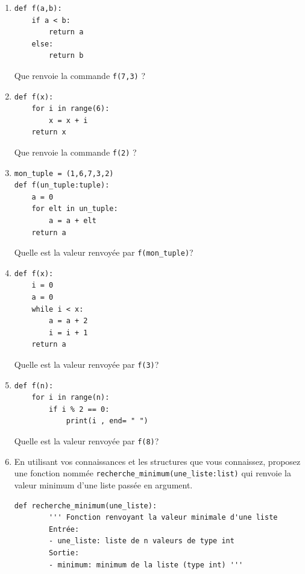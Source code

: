 \documentclass[a4paper,12pt,openany]{book}
\begin{document}
\begin{enumerate}
	\item 
	
	\begin{lstlisting}[numbers=none]
def f(a,b):
	if a < b:
		return a
	else:
		return b
\end{lstlisting}
	
	Que renvoie la commande \verb+f(7,3)+ ? \dotfill
	
	\medskip
	
	\item 
	\begin{lstlisting}[numbers=none]
def f(x):
	for i in range(6):
		x = x + i
	return x
\end{lstlisting}
	
	Que renvoie la commande \verb+f(2)+ ? \dotfill

	\medskip
	
	\item 
	\begin{lstlisting}[numbers=none]
mon_tuple = (1,6,7,3,2)
def f(un_tuple:tuple):
	a = 0
	for elt in un_tuple:
		a = a + elt
	return a
\end{lstlisting}
	
	Quelle est la valeur renvoyée par \verb+f(mon_tuple)+? \dotfill

	\medskip
	
	\item 
	\begin{lstlisting}[numbers=none]
def f(x):
	i = 0
	a = 0
	while i < x:
		a = a + 2
		i = i + 1
	return a
\end{lstlisting}
	
	Quelle est la valeur renvoyée par \verb+f(3)+? \dotfill
	
	\medskip
	
	\item 
	\begin{lstlisting}[numbers=none]
def f(n):
	for i in range(n):
		if i % 2 == 0:
			print(i , end= " ")
\end{lstlisting}
	
	Quelle est la valeur renvoyée par \verb+f(8)+? \dotfill
	

\newpage
	
	\item En utilisant vos connaissances et les structures que vous connaissez, proposez une fonction nommée \verb+recherche_minimum(une_liste:list)+ qui renvoie la valeur minimum d'une liste passée en argument.
	
\begin{lstlisting}[numbers=none]
def recherche_minimum(une_liste):
		''' Fonction renvoyant la valeur minimale d'une liste
		Entrée:
		- une_liste: liste de n valeurs de type int
		Sortie:
		- minimum: minimum de la liste (type int) '''





















\end{lstlisting}
\end{enumerate}
\end{document}

